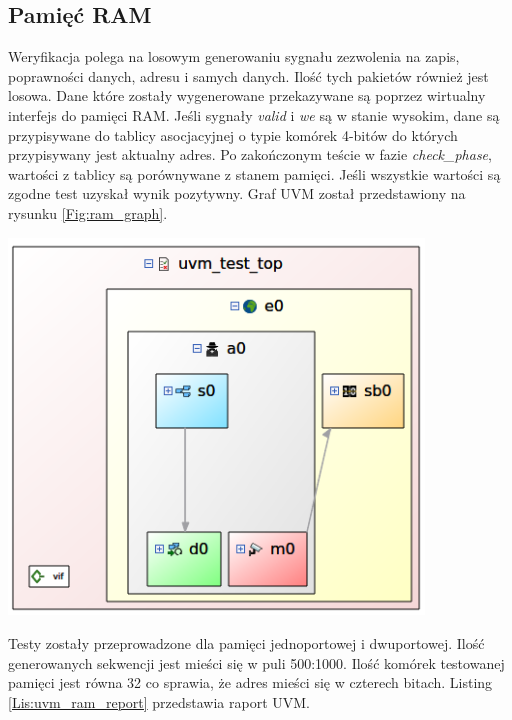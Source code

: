 \documentclass[11pt,a4paper]{article}
\begin{document}
\subsection{Pamięć RAM}
\hspace{5mm} Weryfikacja polega na losowym generowaniu sygnału zezwolenia na zapis, poprawności danych, adresu i samych danych. Ilość tych pakietów również jest losowa. Dane które zostały wygenerowane przekazywane są poprzez wirtualny interfejs do pamięci RAM. Jeśli sygnały \textit{valid} i \textit{we} są w stanie wysokim, dane są przypisywane do tablicy asocjacyjnej o typie komórek 4-bitów do których przypisywany jest aktualny adres. Po zakończonym teście w fazie \textit{check\_phase}, wartości z tablicy są porównywane z stanem pamięci. Jeśli wszystkie wartości są zgodne test uzyskał wynik pozytywny. Graf UVM został przedstawiony na rysunku \ref{Fig:ram_graph}.\\
	\begin{minipage}[c]{\textwidth}
	\begin{center}

					\includegraphics[height=10cm]{./rysunki/ram_graph.png}
	\end{center}	
	\end{minipage} 
Testy zostały przeprowadzone dla pamięci jednoportowej i dwuportowej. Ilość generowanych sekwencji jest mieści się w puli 500:1000. Ilość komórek testowanej pamięci jest równa 32 co sprawia, że adres mieści się w czterech bitach. Listing \ref{Lis:uvm_ram_report} przedstawia raport UVM.\\
\end{document}
